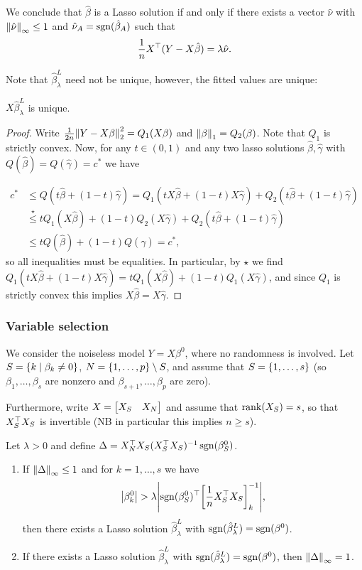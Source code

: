 We conclude that $\hat\beta$ is a Lasso solution if and only if there exists a vector $\hat\nu$ with $\norm{\hat\nu}_{\infty} \leq 1$ and $\hat\nu_A = \operatorname{sgn}(\hat\beta_A)$ such that
\[
\frac1n X^\top(Y - X\hat\beta) = \lambda \hat\nu. 
\]

Note that $\hat\beta^L_\lambda$ need not be unique, however, the fitted values are unique:
\begin{proposition}
	$X\hat\beta_\lambda^L$ is unique. 
\end{proposition}

\begin{proof}
	Write $\frac1{2n}\norm{Y- X\beta}_2^2 = Q_1(X \beta)$ and $\norm{\beta}_1 = Q_2(\beta)$. Note that $Q_1$ is strictly convex. Now, for any $t\in (0, 1)$ and any two lasso solutions $\hat\beta, \hat\gamma$ with $Q(\hat\beta) = Q(\hat\gamma) = c^*$ we have
	
	\begin{align*}
		c^* &\leq Q(t\hat\beta + (1-t)\hat\gamma) = Q_1(tX\hat\beta+(1-t)X\hat\gamma) + Q_2(t\hat\beta + (1-t)\hat\gamma) \\
		&\overset\star\leq t Q_1(X\hat\beta) + (1-t)Q_2(X\hat\gamma) + Q_2(t\hat\beta + (1-t)\hat\gamma) \\
		&\leq t Q(\hat\beta) + (1-t)Q(\hat\gamma) = c^*,
	\end{align*}
so all inequalities must be equalities. In particular, by $\star$ we find $Q_1(tX\hat\beta + (1-t)X\hat\gamma) = t Q_1(X\hat\beta) + (1-t)Q_1(X\hat\gamma)$, and since $Q_1$ is strictly convex this implies $X\hat\beta = X\hat\gamma$. 
\end{proof}

\subsubsection{Variable selection}
We consider the noiseless model $Y = X\beta^0$, where no randomness is involved. Let $S = \qty{k \mid \beta_k \neq 0}$, $N = \qty{1, \dotsc, p} \setminus S$, and assume that $S = \qty{1, \dotsc, s}$ (so $\beta_1, \dotsc, \beta_s$ are nonzero and $\beta_{s+1}, \dotsc, \beta_p$ are zero). 

Furthermore, write $X = \mqty[ X_S & X_N]$ and assume that $\rank(X_S) = s$, so that $X_S^\top X_S$ is invertible (NB in particular this implies $n \geq s$). 
\begin{theorem}
Let $\lambda > 0$ and define $\Delta = X_N^\top X_S(X_S^\top X_S)^{-1} \operatorname{sgn}(\beta^0_S)$. 
\begin{enumerate}
	\item If $\norm{\Delta}_{\infty} \leq 1$ and for $k = 1, \dotsc, s$ we have
	\[
	\abs{\beta^0_k} > \lambda \abs{\operatorname{sgn}(\beta^0_S)^\top \qty[\frac1n X_S^\top X_S]^{-1}_k},
	\]
	then there exists a Lasso solution $\hat\beta_\lambda^L$ with $\operatorname{sgn}(\hat\beta_\lambda^L) = \operatorname{sgn}(\beta^0)$. 
	
	\item If there exists a Lasso solution $\hat\beta_\lambda^L$ with $\operatorname{sgn}(\hat\beta_\lambda^L) = \operatorname{sgn}(\beta^0)$, then $\norm{\Delta}_{\infty} = 1$. 
\end{enumerate}
\end{theorem}

